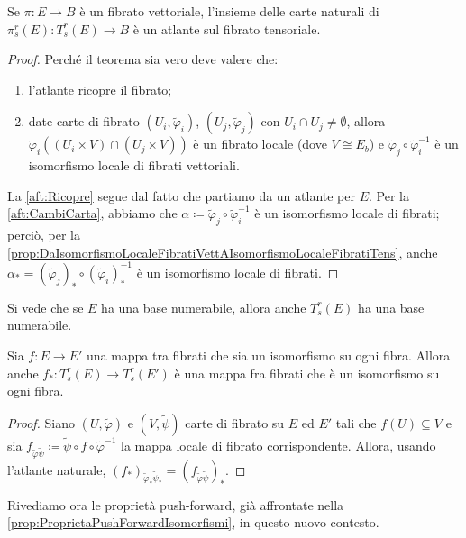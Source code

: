 
\begin{theorem} \label{thm:AtlanteFibratoTensoriale}
	Se $\pi: E \to B$ è un fibrato vettoriale, l'insieme delle carte naturali di $\pi_s^r(E):T_s^r(E) \to B$ è un atlante sul fibrato tensoriale.
\end{theorem}
\begin{proof}
	Perché il teorema sia vero deve valere che:
	\begin{enumerate}
		\item l'atlante ricopre il fibrato; \label{aft:Ricopre}
		\item date carte di fibrato $(U_i,\tilde\varphi_i)$, $(U_j,\tilde\varphi_j)$ con $U_i\cap U_j\not=\emptyset$, allora $\tilde\varphi_i( (U_i\times V) \cap (U_j\times V) )$ è un fibrato locale (dove $V\cong E_b$) e $\tilde\varphi_j\circ \tilde\varphi_i^{-1}$ è un isomorfismo locale di fibrati vettoriali. \label{aft:CambiCarta}
	\end{enumerate}
	La \ref{aft:Ricopre} segue dal fatto che partiamo da un atlante per $E$.
	Per la \ref{aft:CambiCarta}, abbiamo che $\alpha \coloneqq \tilde\varphi_j\circ \tilde\varphi_i^{-1}$ è un isomorfismo locale di fibrati; perciò, per la \cref{prop:DaIsomorfismoLocaleFibratiVettAIsomorfismoLocaleFibratiTens}, anche $\alpha_* = (\tilde\varphi_j)_*\circ (\tilde\varphi_i)_*^{-1}$ è un isomorfismo locale di fibrati.
\end{proof}

\begin{remark}
	Si vede che se $E$ ha una base numerabile, allora anche $T_s^r(E)$ ha una base numerabile. 
\end{remark}

\begin{proposition}
	Sia $f:E\to E'$ una mappa tra fibrati che sia un isomorfismo su ogni fibra. Allora anche $f_*:T_s^r(E) \to T_s^r(E')$ è una mappa fra fibrati che è un isomorfismo su ogni fibra.
\end{proposition}
\begin{proof}
	Siano $(U,\tilde\varphi)$ e $(V,\tilde\psi)$ carte di fibrato su $E$ ed $E'$ tali che $f(U) \subseteq V$ e sia $f_{\tilde\varphi\tilde\psi} \coloneqq \tilde\psi \circ f \circ \tilde\varphi^{-1}$ la mappa locale di fibrato corrispondente. Allora, usando l'atlante naturale, $(f_*)_{\tilde\varphi_*\tilde\psi_*} = (f_{\tilde\varphi\tilde\psi})_*$.
\end{proof}

Rivediamo ora le proprietà push-forward, già affrontate nella \cref{prop:ProprietaPushForwardIsomorfismi}, in questo nuovo contesto.

